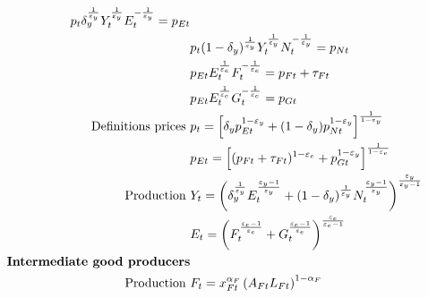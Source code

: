 \begin{align}
 p_{t}\delta_y^\frac{1}{\varepsilon_y}Y_t^\frac{1}{\varepsilon_y}E_t^{-\frac{1}{\varepsilon_y}}=p_{Et}\nonumber\\
& p_{t}(1-\delta_y)^\frac{1}{\varepsilon_y}Y_t^\frac{1}{\varepsilon_y}N_t^{-\frac{1}{\varepsilon_y}}=p_{Nt}\nonumber\\
&
p_{Et}E_t^\frac{1}{\varepsilon_e}{F}_t^{-\frac{1}{\varepsilon_e}}=p_{{F}t}+\tau_{Ft}\nonumber\\
& p_{Et}E_t^\frac{1}{\varepsilon_e}G_t^{-\frac{1}{\varepsilon_e}}=p_{Gt}\nonumber\\
\text{Definitions prices}\ \vspace{4mm}&
p_{t}= \left[\delta_yp_{Et}^{1-\varepsilon_y}+(1-\delta_y)p_{Nt}^{1-\varepsilon_y}\right]^\frac{1}{1-\varepsilon_y}\nonumber\\
& p_{Et}= \left[(p_{{F}t}+\tau_{Ft})^{1-\varepsilon_e}+p_{Gt}^{1-\varepsilon_y}\right]^\frac{1}{1-\varepsilon_e}\nonumber\\
\text{Production}\ \vspace{4mm}& 
Y_t=\left(\delta_y^\frac{1}{\varepsilon_y}E_t^\frac{\varepsilon_y-1}{\varepsilon_y}+(1-\delta_y)^\frac{1}{\varepsilon_y}N_t^\frac{\varepsilon_y-1}{\varepsilon_y}\right)^\frac{\varepsilon_y}{\varepsilon_y-1}\label{mod:y}\\
&E_t=\left({F}_t^\frac{\varepsilon_e-1}{\varepsilon_e}+G_t^\frac{\varepsilon_e-1}{\varepsilon_e}\right)^\frac{\varepsilon_e}{\varepsilon_e-1}\label{mod:E}\\
\text{\textbf{Intermediate good producers}}&\nonumber\\
\text{Production}\ \vspace{4mm}& F_t= x_{Ft}^{\alpha_F}\left(A_{Ft}L_{Ft}\right)^{1-\alpha_F}%
\label{mod:F}\\

\end{align}
